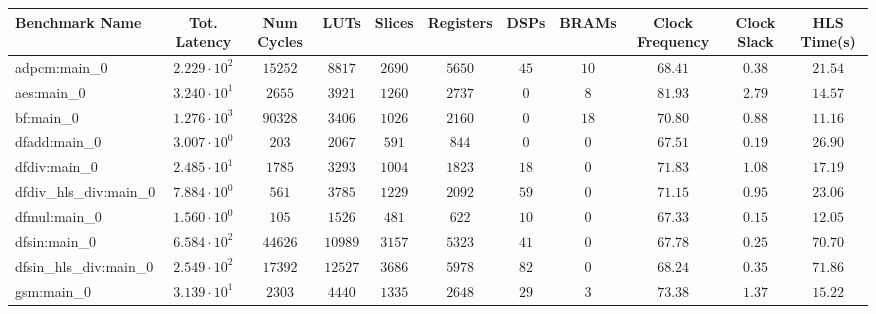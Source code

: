 \begin{tabular}{|l|c|c|c|c|c|c|c|c|c|c|}
\hline
Benchmark Name          & Tot. Latency           & Num Cycles & LUTs      & Slices    & Registers & DSPs    & BRAMs   & Clock Frequency & Clock Slack & HLS Time(s) \\
\hline
adpcm:main\_0           & $ 2.229 \cdot 10^{2} $ & $ 15252  $ & $ 8817  $ & $ 2690  $ & $ 5650  $ & $ 45  $ & $ 10  $ & $ 68.41       $ & $ 0.38    $ & $ 21.54   $ \\
aes:main\_0             & $ 3.240 \cdot 10^{1} $ & $ 2655   $ & $ 3921  $ & $ 1260  $ & $ 2737  $ & $ 0   $ & $ 8   $ & $ 81.93       $ & $ 2.79    $ & $ 14.57   $ \\
bf:main\_0              & $ 1.276 \cdot 10^{3} $ & $ 90328  $ & $ 3406  $ & $ 1026  $ & $ 2160  $ & $ 0   $ & $ 18  $ & $ 70.80       $ & $ 0.88    $ & $ 11.16   $ \\
dfadd:main\_0           & $ 3.007 \cdot 10^{0} $ & $ 203    $ & $ 2067  $ & $ 591   $ & $ 844   $ & $ 0   $ & $ 0   $ & $ 67.51       $ & $ 0.19    $ & $ 26.90   $ \\
dfdiv:main\_0           & $ 2.485 \cdot 10^{1} $ & $ 1785   $ & $ 3293  $ & $ 1004  $ & $ 1823  $ & $ 18  $ & $ 0   $ & $ 71.83       $ & $ 1.08    $ & $ 17.19   $ \\
dfdiv\_hls\_div:main\_0 & $ 7.884 \cdot 10^{0} $ & $ 561    $ & $ 3785  $ & $ 1229  $ & $ 2092  $ & $ 59  $ & $ 0   $ & $ 71.15       $ & $ 0.95    $ & $ 23.06   $ \\
dfmul:main\_0           & $ 1.560 \cdot 10^{0} $ & $ 105    $ & $ 1526  $ & $ 481   $ & $ 622   $ & $ 10  $ & $ 0   $ & $ 67.33       $ & $ 0.15    $ & $ 12.05   $ \\
dfsin:main\_0           & $ 6.584 \cdot 10^{2} $ & $ 44626  $ & $ 10989 $ & $ 3157  $ & $ 5323  $ & $ 41  $ & $ 0   $ & $ 67.78       $ & $ 0.25    $ & $ 70.70   $ \\
dfsin\_hls\_div:main\_0 & $ 2.549 \cdot 10^{2} $ & $ 17392  $ & $ 12527 $ & $ 3686  $ & $ 5978  $ & $ 82  $ & $ 0   $ & $ 68.24       $ & $ 0.35    $ & $ 71.86   $ \\
gsm:main\_0             & $ 3.139 \cdot 10^{1} $ & $ 2303   $ & $ 4440  $ & $ 1335  $ & $ 2648  $ & $ 29  $ & $ 3   $ & $ 73.38       $ & $ 1.37    $ & $ 15.22   $ \\

\end{tabular}
